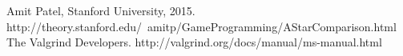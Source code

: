\begin{thebibliography}{11}
		Amit Patel, Stanford University, 2015. http://theory.stanford.edu/~amitp/GameProgramming/AStarComparison.html
		The Valgrind Developers. http://valgrind.org/docs/manual/ms-manual.html
\end{thebibliography}